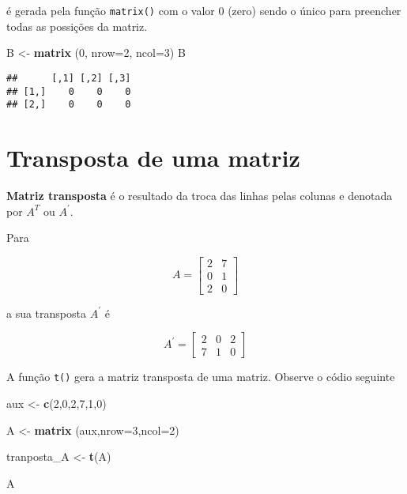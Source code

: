 \documentclass[
]{book}
\newenvironment{Shaded}{\begin{snugshade}}{\end{snugshade}}
\newcommand{\DataTypeTok}[1]{\textcolor[rgb]{0.13,0.29,0.53}{#1}}
\newcommand{\DecValTok}[1]{\textcolor[rgb]{0.00,0.00,0.81}{#1}}
\newcommand{\KeywordTok}[1]{\textcolor[rgb]{0.13,0.29,0.53}{\textbf{#1}}}
\newcommand{\NormalTok}[1]{#1}
\newcommand{\StringTok}[1]{\textcolor[rgb]{0.31,0.60,0.02}{#1}}
\begin{document}
é gerada pela função \texttt{matrix()} com o valor 0 (zero) sendo o único para preencher todas as possições da matriz.

\begin{Shaded}
\begin{Highlighting}[]
\NormalTok{B \textless{}{-}}\StringTok{ }\KeywordTok{matrix}\NormalTok{ (}\DecValTok{0}\NormalTok{, }\DataTypeTok{nrow=}\DecValTok{2}\NormalTok{, }\DataTypeTok{ncol=}\DecValTok{3}\NormalTok{)}
\NormalTok{B}
\end{Highlighting}
\end{Shaded}

\begin{verbatim}
##      [,1] [,2] [,3]
## [1,]    0    0    0
## [2,]    0    0    0
\end{verbatim}

\hypertarget{transposta-de-uma-matriz}{%
\section{Transposta de uma matriz}\label{transposta-de-uma-matriz}}

\textbf{Matriz transposta} é o resultado da troca das linhas pelas colunas e denotada por \(A^T\) ou \(A^\prime\).

Para

\begin{equation*}
A = 
\begin{bmatrix}
2 & 7 \\
0 & 1 \\
2 & 0 
\end{bmatrix}
\end{equation*}

a sua transposta \(A^\prime\) é

\begin{equation*}
A^\prime = 
\begin{bmatrix}
2 & 0 & 2\\
7 & 1 & 0
\end{bmatrix}
\end{equation*}

A função \texttt{t()} gera a matriz transposta de uma matriz. Observe o códio seguinte

\begin{Shaded}
\begin{Highlighting}[]
\NormalTok{aux \textless{}{-}}\StringTok{ }\KeywordTok{c}\NormalTok{(}\DecValTok{2}\NormalTok{,}\DecValTok{0}\NormalTok{,}\DecValTok{2}\NormalTok{,}\DecValTok{7}\NormalTok{,}\DecValTok{1}\NormalTok{,}\DecValTok{0}\NormalTok{)}

\NormalTok{A \textless{}{-}}\StringTok{ }\KeywordTok{matrix}\NormalTok{ (aux,}\DataTypeTok{nrow=}\DecValTok{3}\NormalTok{,}\DataTypeTok{ncol=}\DecValTok{2}\NormalTok{)}

\NormalTok{tranposta\_A \textless{}{-}}\StringTok{ }\KeywordTok{t}\NormalTok{(A)}

\NormalTok{A}
\end{Highlighting}
\end{Shaded}
\end{document}
